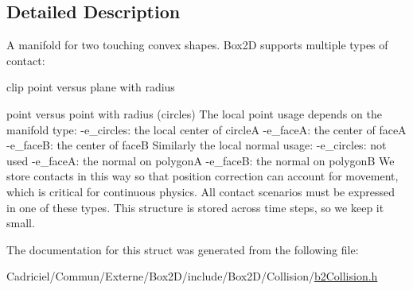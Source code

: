 \subsection{Detailed Description}
A manifold for two touching convex shapes. Box2D supports multiple types of contact\+:
\begin{DoxyItemize}
\item clip point versus plane with radius
\item point versus point with radius (circles) The local point usage depends on the manifold type\+: -\/e\+\_\+circles\+: the local center of circleA -\/e\+\_\+faceA\+: the center of faceA -\/e\+\_\+faceB\+: the center of faceB Similarly the local normal usage\+: -\/e\+\_\+circles\+: not used -\/e\+\_\+faceA\+: the normal on polygonA -\/e\+\_\+faceB\+: the normal on polygonB We store contacts in this way so that position correction can account for movement, which is critical for continuous physics. All contact scenarios must be expressed in one of these types. This structure is stored across time steps, so we keep it small. 
\end{DoxyItemize}

The documentation for this struct was generated from the following file\+:\begin{DoxyCompactItemize}
\item 
Cadriciel/\+Commun/\+Externe/\+Box2\+D/include/\+Box2\+D/\+Collision/\hyperlink{b2_collision_8h}{b2\+Collision.\+h}\end{DoxyCompactItemize}

